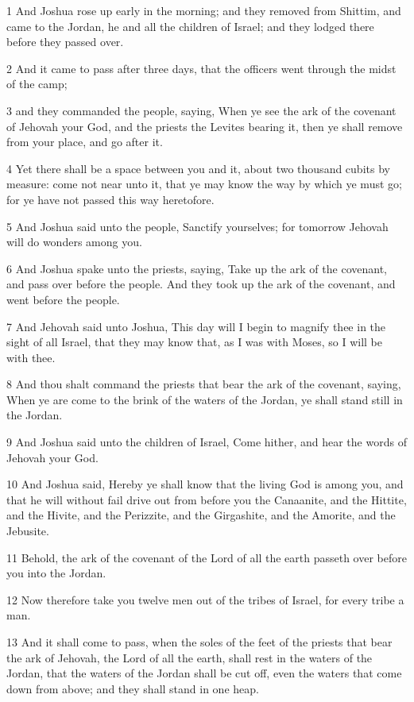 \par 1 And Joshua rose up early in the morning; and they removed from Shittim, and came to the Jordan, he and all the children of Israel; and they lodged there before they passed over.
\par 2 And it came to pass after three days, that the officers went through the midst of the camp;
\par 3 and they commanded the people, saying, When ye see the ark of the covenant of Jehovah your God, and the priests the Levites bearing it, then ye shall remove from your place, and go after it.
\par 4 Yet there shall be a space between you and it, about two thousand cubits by measure: come not near unto it, that ye may know the way by which ye must go; for ye have not passed this way heretofore.
\par 5 And Joshua said unto the people, Sanctify yourselves; for tomorrow Jehovah will do wonders among you.
\par 6 And Joshua spake unto the priests, saying, Take up the ark of the covenant, and pass over before the people. And they took up the ark of the covenant, and went before the people.
\par 7 And Jehovah said unto Joshua, This day will I begin to magnify thee in the sight of all Israel, that they may know that, as I was with Moses, so I will be with thee.
\par 8 And thou shalt command the priests that bear the ark of the covenant, saying, When ye are come to the brink of the waters of the Jordan, ye shall stand still in the Jordan.
\par 9 And Joshua said unto the children of Israel, Come hither, and hear the words of Jehovah your God.
\par 10 And Joshua said, Hereby ye shall know that the living God is among you, and that he will without fail drive out from before you the Canaanite, and the Hittite, and the Hivite, and the Perizzite, and the Girgashite, and the Amorite, and the Jebusite.
\par 11 Behold, the ark of the covenant of the Lord of all the earth passeth over before you into the Jordan.
\par 12 Now therefore take you twelve men out of the tribes of Israel, for every tribe a man.
\par 13 And it shall come to pass, when the soles of the feet of the priests that bear the ark of Jehovah, the Lord of all the earth, shall rest in the waters of the Jordan, that the waters of the Jordan shall be cut off, even the waters that come down from above; and they shall stand in one heap.
